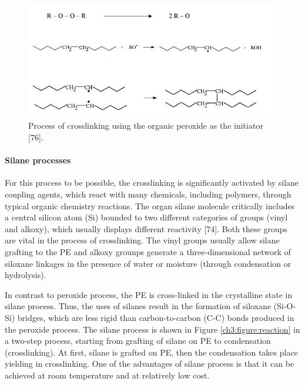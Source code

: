 \documentclass[12pt]{report}
\begin{document}
\begin{figure}[H]
    \centering
    \includegraphics[width=.9\textwidth]{process_of_crosslinking_using_the_organic_peroxide_as_the_initiator.jpg}
    \caption{Process of crosslinking using the organic peroxide as the initiator [76]. }
    \label{ch3:figure:crosslinking_process}
\end{figure}

\paragraph{Silane processes}
For this process to be possible, the crosslinking is significantly activated by silane coupling agents, which react with many chemicals, including polymers, through typical organic chemistry reactions. The organ silane molecule critically includes a central silicon atom (Si) bounded to two different categories of groups (vinyl and alkoxy), which usually displays different reactivity [74]. Both these groups are vital in the process of crosslinking. The vinyl groups usually allow silane grafting to the PE and alkoxy grounps generate a three-dimensional network of siloxane linkages in the presence of water or moisture (through condensation or hydrolysis). 

In contrast to peroxide process, the PE is cross-linked in the crystalline state in silane process. Thus, the uses of silanes result in the formation of siloxane (Si-O-Si) bridges, which are less rigid than carbon-to-carbon (C-C) bonds produced in the peroxide process. The silane process is shown in Figure \ref{ch3:figure:reaction} in a two-step process, starting from grafting of silane on PE to condensation (crosslinking). At first, silane is grafted on PE, then the condensation takes place yielding in crosslinking. One of the advantages of silane process is that it can be achieved at room temperature and at relatively low cost. 
\end{document}
